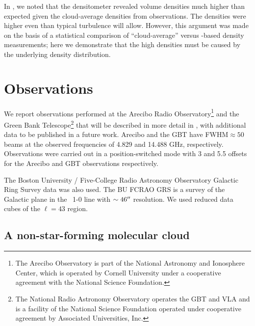In \citet{Ginsburg2011a}, we noted that the \formaldehyde densitometer revealed
volume densities much higher than expected given the cloud-average densities
from \thirteenco observations.  The densities were higher even than typical
turbulence will allow.  However, this argument was made on the basis of a
statistical comparison of ``cloud-average'' versus \formaldehyde-based density
measurements; here we demonstrate that the high \formaldehyde densities
must be caused by the underlying density distribution.


\section{Observations}
We report \formaldehyde observations performed at the Arecibo Radio
Observatory\footnote{The Arecibo Observatory is part of the National Astronomy
and Ionosphere Center, which is operated by Cornell University under a
cooperative agreement with the National Science Foundation.  } and the Green
Bank Telescope\footnote{ The National Radio Astronomy Observatory operates the
GBT and VLA and is a facility of the National Science Foundation operated under
cooperative agreement by Associated Universities, Inc.  } that will be
described in more detail in \citet{Ginsburg2011a}, with additional data to be
published in a future work.  Arecibo and the GBT have FWHM$\approx50$\arcsec
beams at the observed frequencies of 4.829 and 14.488 GHz, respectively.
Observations were carried out in a position-switched mode with 3 and 5.5\arcmin
offsets for the Arecibo and GBT observations respectively.

The Boston University / Five-College Radio Astronomy Observatory Galactic Ring
Survey \thirteenco data was also used.  The BU FCRAO GRS \citep{Jackson2006a}
is a survey of the Galactic plane in the \thirteenco\ 1-0 line with $\sim
46\mbox{$^{\prime\prime}$}$ resolution.  We used reduced data cubes of the $\ell=43$ region.

\subsection{A non-star-forming molecular cloud}



